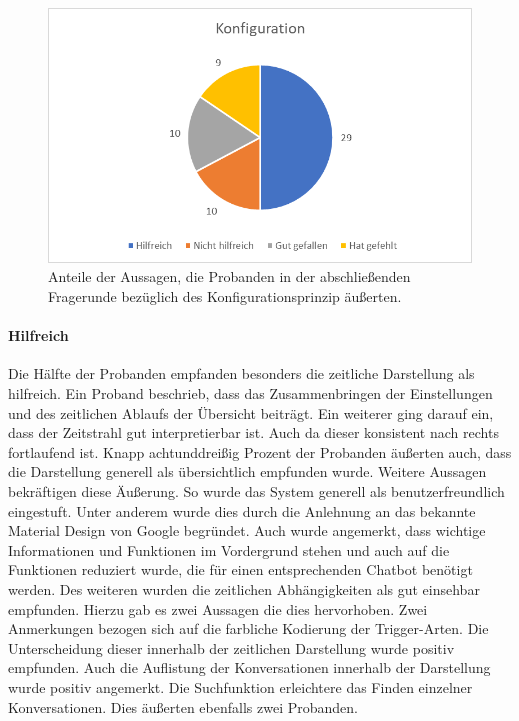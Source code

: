 \begin{figure}[h]
\centering
\includegraphics[width=1\textwidth]{pictures/diagramme/aussagenkonfig}
\caption{Anteile der Aussagen, die Probanden in der abschließenden Fragerunde bezüglich des Konfigurationsprinzip äußerten.}
\label{aussagensichtb}
\end{figure}


\paragraph{Hilfreich}Die Hälfte der Probanden empfanden besonders die zeitliche Darstellung als hilfreich. Ein Proband beschrieb, dass das Zusammenbringen der Einstellungen und des zeitlichen Ablaufs der Übersicht beiträgt. Ein weiterer ging darauf ein, dass der Zeitstrahl gut interpretierbar ist. Auch da dieser konsistent nach rechts fortlaufend ist. Knapp achtunddreißig Prozent der Probanden äußerten auch, dass die Darstellung generell als übersichtlich empfunden wurde. Weitere Aussagen bekräftigen diese Äußerung. So wurde das System generell als benutzerfreundlich eingestuft. Unter anderem wurde dies durch die Anlehnung an das bekannte Material Design von Google begründet. Auch wurde angemerkt, dass wichtige Informationen und Funktionen im Vordergrund stehen und auch auf die Funktionen reduziert wurde, die für einen entsprechenden Chatbot benötigt werden. Des weiteren wurden die zeitlichen Abhängigkeiten als gut einsehbar empfunden. Hierzu gab es zwei Aussagen die dies hervorhoben. Zwei Anmerkungen bezogen sich auf die farbliche Kodierung der Trigger-Arten. Die Unterscheidung dieser innerhalb der zeitlichen Darstellung wurde positiv empfunden. Auch die Auflistung der Konversationen innerhalb der Darstellung wurde positiv angemerkt. Die Suchfunktion erleichtere das Finden einzelner Konversationen. Dies äußerten ebenfalls zwei Probanden.


